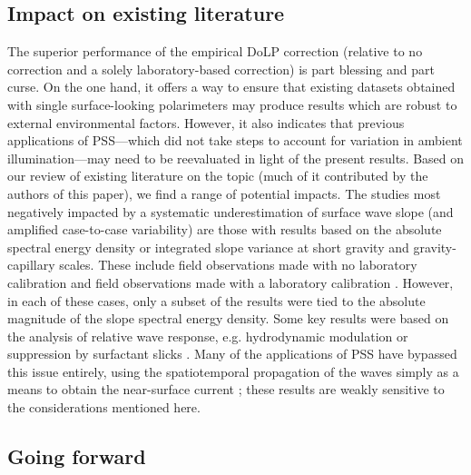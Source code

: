 \documentclass[letterpaper,draftcls,onecolumn]{IEEEtran}
\begin{document}

\subsection{Impact on existing literature}

The superior performance of the empirical DoLP correction (relative to no correction and a solely laboratory-based correction) is part blessing and part curse. On the one hand, it offers a way to ensure that existing datasets obtained with single surface-looking polarimeters may produce results which are robust to external environmental factors. However, it also indicates that previous applications of PSS---which did not take steps to account for variation in ambient illumination---may need to be reevaluated in light of the present results. Based on our review of existing literature on the topic (much of it contributed by the authors of this paper), we find a range of potential impacts. The studies most negatively impacted by a systematic underestimation of surface wave slope (and amplified case-to-case variability) are those with results based on the absolute spectral energy density or integrated slope variance at short gravity and gravity-capillary scales. These include field observations made with no laboratory calibration \cite{Laxague2015} and field observations made with a laboratory calibration \cite{Zappa2012,Laxague2018b}. However, in each of these cases, only a subset of the results were tied to the absolute magnitude of the slope spectral energy density. Some key results were based on the analysis of relative wave response, e.g. hydrodynamic modulation \cite{Laxague2017a} or suppression by surfactant slicks \cite{laxague_suppression_2024}. Many of the applications of PSS have bypassed this issue entirely, using the spatiotemporal propagation of the waves simply as a means to obtain the near-surface current \cite{Laxague2017b,Laxague2018a,Laxague2020a,Laxague2020b}; these results are weakly sensitive to the considerations mentioned here.

\subsection{Going forward}
\label{sec:forward}
\end{document}
